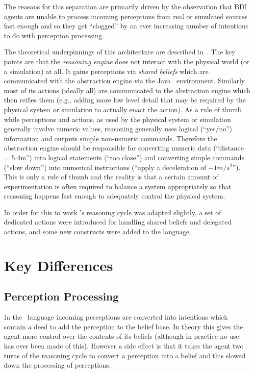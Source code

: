 \documentclass[a4]{article}
\begin{document}
The reasons for this separation are primarily driven by the observation that BDI agents are unable to process incoming perceptions from real or simulated sources fast enough and so they get ``clogged'' by an ever increasing number of intentions to do with perception processing.  

The theoretical underpinnings of this architecture are described in~\cite{DALT10:abstraction}.  The key points are that the \emph{reasoning engine} does not interact with the physical world (or a simulation) at all.  It gains perceptions via \emph{shared beliefs} which are communicated with the abstraction engine via the Java \eass\ environment.  Similarly most of its actions (ideally all) are communicated to the abstraction engine which then reifies them (e.g., adding more low level detail that may be required by the physical system or simulation to actually enact the action).  As a rule of thumb while perceptions and actions, as used by the physical system or simulation generally involve numeric values, reasoning generally uses logical (``yes/no'') information and outputs simple non-numeric commands.  Therefore the abstraction engine should be responsible for converting numeric data (``distance = 5.4m'') into logical statements (``too close'') and converting simple commands (``slow down'') into numerical instructions (``apply a deceleration of $-1m/s^2$'').  This is only a rule of thumb and the reality is that a certain amount of experimentation is often required to balance a system appropriately so that reasoning happens fast enough to adequately control the physical system.

In order for this to work \gwendolen's reasoning cycle was adapted slightly, a set of dedicated actions were introduced for handling shared beliefs and delegated actions, and some new constructs were added to the language.

\section{Key Differences}
\subsection{Perception Processing}
In the \gwendolen\ language incoming perceptions are converted into intentions which contain a deed to add the perception to the belief base.  In theory this gives the agent more control over the contents of its beliefs (although in practice no use has ever been made of this).  However a side effect is that it takes the agent two turns of the reasoning cycle to convert a perception into a belief and this slowed down the processing of perceptions.
\end{document}
